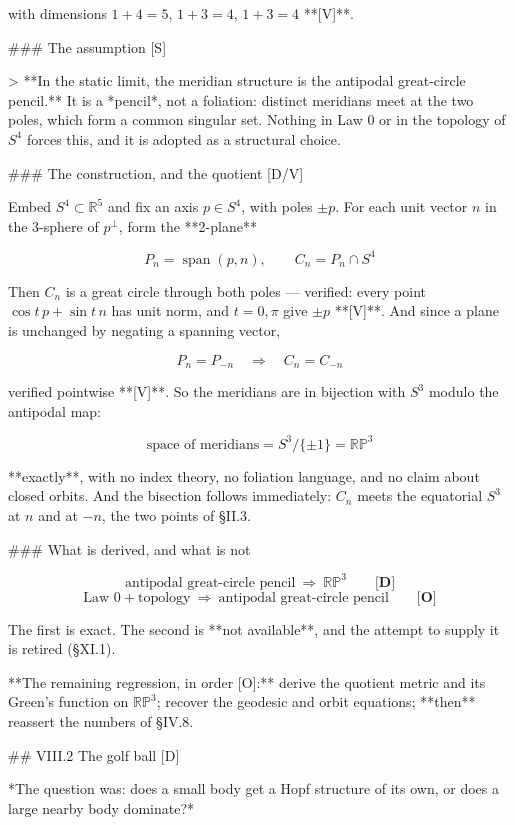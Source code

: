 with dimensions $1+4 = 5$, $1+3 = 4$, $1+3 = 4$ **[V]**.

### The assumption [S]

> **In the static limit, the meridian structure is the antipodal great-circle pencil.** It is a *pencil*, not a foliation: distinct meridians meet at the two poles, which form a common singular set. Nothing in Law 0 or in the topology of $S^4$ forces this, and it is adopted as a structural choice.

### The construction, and the quotient [D/V]

Embed $S^4\subset\mathbb{R}^5$ and fix an axis $p\in S^4$, with poles $\pm p$. For each unit vector $n$ in the 3-sphere of $p^\perp$, form the **2-plane**

$$P_n = \operatorname{span}(p,n),\qquad C_n = P_n\cap S^4$$

Then $C_n$ is a great circle through both poles — verified: every point $\cos t\,p+\sin t\,n$ has unit norm, and $t = 0,\pi$ give $\pm p$ **[V]**. And since a plane is unchanged by negating a spanning vector,

$$P_n = P_{-n}\quad\Longrightarrow\quad C_n = C_{-n}$$

verified pointwise **[V]**. So the meridians are in bijection with $S^3$ modulo the antipodal map:

$$\boxed{\ \text{space of meridians} = S^3/\{\pm1\} = \mathbb{RP}^3\ }$$

**exactly**, with no index theory, no foliation language, and no claim about closed orbits. And the bisection follows immediately: $C_n$ meets the equatorial $S^3$ at $n$ and at $-n$, the two points of §II.3.

### What is derived, and what is not

$$\text{antipodal great-circle pencil}\ \Longrightarrow\ \mathbb{RP}^3\qquad\textbf{[D]}$$
$$\text{Law 0} + \text{topology}\ \Longrightarrow\ \text{antipodal great-circle pencil}\qquad\textbf{[O]}$$

The first is exact. The second is **not available**, and the attempt to supply it is retired (§XI.1).

**The remaining regression, in order [O]:** derive the quotient metric and its Green's function on $\mathbb{RP}^3$; recover the geodesic and orbit equations; **then** reassert the numbers of §IV.8.

## VIII.2 The golf ball [D]

*The question was: does a small body get a Hopf structure of its own, or does a large nearby body dominate?*

